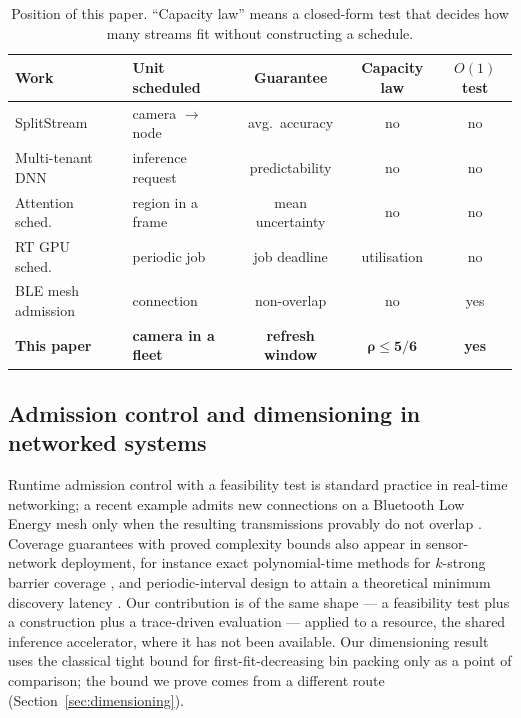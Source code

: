 \documentclass[preprint,review,12pt]{elsarticle}
\theoremstyle{definition}
\newcommand{\dens}{\rho}
\begin{document}
\begin{table}[t]
\centering\small
\caption{Position of this paper. ``Capacity law'' means a closed-form test that decides how many
streams fit without constructing a schedule.}
\label{tab:related}
\footnotesize\setlength{\tabcolsep}{4pt}
\begin{tabular}{llccc}
\toprule
Work & Unit scheduled & Guarantee & Capacity law & $O(1)$ test \\
\midrule
SplitStream \cite{liang2024splitstream} & camera $\to$ node & avg.\ accuracy & no & no \\
Multi-tenant DNN \cite{liu2026multitenant} & inference request & predictability & no & no \\
Attention sched.\ \cite{liu2023attention} & region in a frame & mean uncertainty & no & no \\
RT GPU sched.\ \cite{zou2023rtgpu} & periodic job & job deadline & utilisation & no \\
BLE mesh admission \cite{leonardi2025racble} & connection & non-overlap & no & yes \\
\textbf{This paper} & \textbf{camera in a fleet} & \textbf{refresh window} & $\bm{\dens\le5/6}$ & \textbf{yes} \\
\bottomrule
\end{tabular}
\end{table}

\subsection{Admission control and dimensioning in networked systems}
Runtime admission control with a feasibility test is standard practice in real-time networking;
a recent example admits new connections on a Bluetooth Low Energy mesh only when the resulting
transmissions provably do not overlap \cite{leonardi2025racble}. Coverage guarantees with proved
complexity bounds also appear in sensor-network deployment, for instance exact polynomial-time
methods for $k$-strong barrier coverage \cite{binh2024barrier}, and periodic-interval design to
attain a theoretical minimum discovery latency \cite{cheng2026cpbis}. Our contribution is of the
same shape --- a feasibility test plus a construction plus a trace-driven evaluation --- applied
to a resource, the shared inference accelerator, where it has not been available. Our
dimensioning result uses the classical tight bound for first-fit-decreasing bin packing
\cite{dosa2007ffd} only as a point of comparison; the bound we prove comes from a different route
(Section~\ref{sec:dimensioning}).
\end{document}
